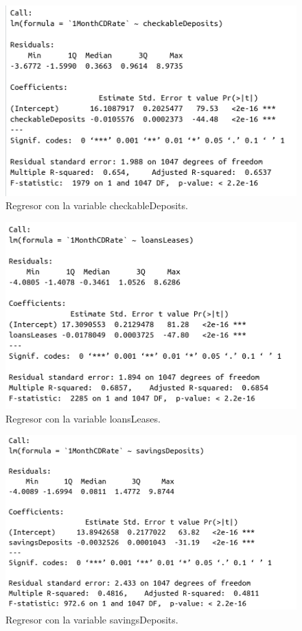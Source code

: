 \documentclass[12pt,a4paper]{article}
\begin{document}
\begin{figure}[H]
	\centering 
	\includegraphics[scale=0.55]{./Imagenes/Regresion/regresor_1va12.png}
	\caption{Regresor con la variable checkableDeposits.}
\end{figure}

\begin{figure}[H]
	\centering 
	\includegraphics[scale=0.55]{./Imagenes/Regresion/regresor_1va13.png}
	\caption{Regresor con la variable loansLeases.}
\end{figure}

\begin{figure}[H]
	\centering 
	\includegraphics[scale=0.55]{./Imagenes/Regresion/regresor_1va14.png}
	\caption{Regresor con la variable savingsDeposits.}
\end{figure}
\end{document}
